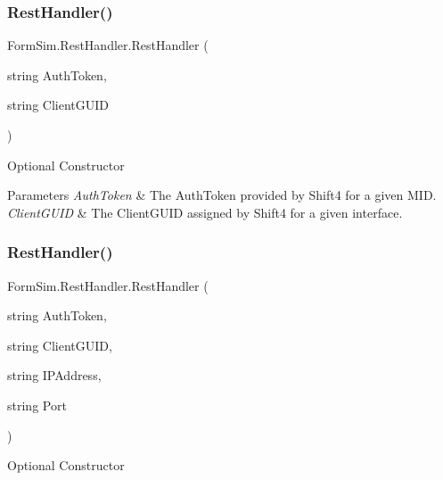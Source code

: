 \subsubsection{\texorpdfstring{Rest\+Handler()}{RestHandler()}\hspace{0.1cm}{\footnotesize\ttfamily [2/3]}}
{\footnotesize\ttfamily Form\+Sim.\+Rest\+Handler.\+Rest\+Handler (\begin{DoxyParamCaption}\item[{string}]{Auth\+Token,  }\item[{string}]{Client\+G\+U\+ID }\end{DoxyParamCaption})\hspace{0.3cm}{\ttfamily [inline]}}



Optional Constructor 


\begin{DoxyParams}{Parameters}
{\em Auth\+Token} & The Auth\+Token provided by Shift4 for a given M\+ID.\\
\hline
{\em Client\+G\+U\+ID} & The Client\+G\+U\+ID assigned by Shift4 for a given interface.\\
\hline
\end{DoxyParams}
\mbox{\label{class_form_sim_1_1_rest_handler_a01f0a6ed0453bcdf536d4062650d5bbf}} 
\subsubsection{\texorpdfstring{Rest\+Handler()}{RestHandler()}\hspace{0.1cm}{\footnotesize\ttfamily [3/3]}}
{\footnotesize\ttfamily Form\+Sim.\+Rest\+Handler.\+Rest\+Handler (\begin{DoxyParamCaption}\item[{string}]{Auth\+Token,  }\item[{string}]{Client\+G\+U\+ID,  }\item[{string}]{I\+P\+Address,  }\item[{string}]{Port }\end{DoxyParamCaption})\hspace{0.3cm}{\ttfamily [inline]}}



Optional Constructor 


